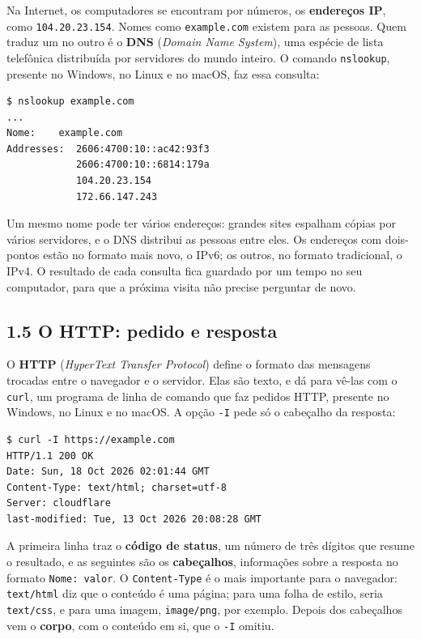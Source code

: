 Na Internet, os computadores se encontram por números, os \textbf{endereços IP}, como \texttt{104.20.23.154}. Nomes como \texttt{example.com} existem para as pessoas. Quem traduz um no outro é o \textbf{DNS} (\textit{Domain Name System}), uma espécie de lista telefônica distribuída por servidores do mundo inteiro. O comando \texttt{nslookup}, presente no Windows, no Linux e no macOS, faz essa consulta:

\begin{codigo}
\begin{Verbatim}[breaklines=true, breaksymbolleft={}, fontsize=\footnotesize]
$ nslookup example.com
...
Nome:    example.com
Addresses:  2606:4700:10::ac42:93f3
            2606:4700:10::6814:179a
            104.20.23.154
            172.66.147.243
\end{Verbatim}
\end{codigo}

Um mesmo nome pode ter vários endereços: grandes sites espalham cópias por vários servidores, e o DNS distribui as pessoas entre eles. Os endereços com dois-pontos estão no formato mais novo, o IPv6; os outros, no formato tradicional, o IPv4. O resultado de cada consulta fica guardado por um tempo no seu computador, para que a próxima visita não precise perguntar de novo.

\subsection{1.5 O HTTP: pedido e resposta}

O \textbf{HTTP} (\textit{HyperText Transfer Protocol}) define o formato das mensagens trocadas entre o navegador e o servidor. Elas são texto, e dá para vê-las com o \texttt{curl}, um programa de linha de comando que faz pedidos HTTP, presente no Windows, no Linux e no macOS. A opção \texttt{-I} pede só o cabeçalho da resposta:

\begin{codigo}
\begin{Verbatim}[breaklines=true, breaksymbolleft={}, fontsize=\footnotesize]
$ curl -I https://example.com
HTTP/1.1 200 OK
Date: Sun, 18 Oct 2026 02:01:44 GMT
Content-Type: text/html; charset=utf-8
Server: cloudflare
last-modified: Tue, 13 Oct 2026 20:08:28 GMT
\end{Verbatim}
\end{codigo}

A primeira linha traz o \textbf{código de status}, um número de três dígitos que resume o resultado, e as seguintes são os \textbf{cabeçalhos}, informações sobre a resposta no formato \texttt{Nome: valor}. O \texttt{Content-Type} é o mais importante para o navegador: \texttt{text/html} diz que o conteúdo é uma página; para uma folha de estilo, seria \texttt{text/css}, e para uma imagem, \texttt{image/png}, por exemplo. Depois dos cabeçalhos vem o \textbf{corpo}, com o conteúdo em si, que o \texttt{-I} omitiu.

